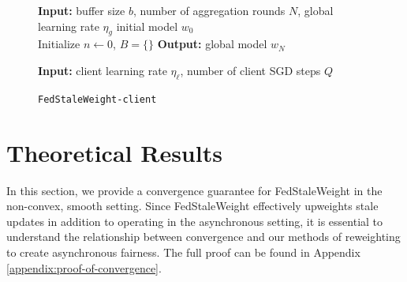 \documentclass{article}
\begin{document}
\begin{figure}[htbp]
\centering
\begin{minipage}{0.51\linewidth}
    \begin{algorithm}[H]
    \caption{\texttt{FedStaleWeight-server}}
    \label{algo:server}
    \SetAlgoLined
    \DontPrintSemicolon
    \textbf{Input: } buffer size $b$, number of aggregation rounds $N$, global learning rate $\eta_g$ initial model $w_0$\\
    Initialize $n \leftarrow 0$, $B = \{\}$ \;
    \textbf{Output: } global model $w_N$\\
    \end{algorithm}
\end{minipage}
\hfill
\begin{minipage}{0.47\linewidth}
    \begin{algorithm}[H]
    \caption{\texttt{FedStaleWeight-client}}
    \label{algo:client}
    \SetAlgoLined
    \DontPrintSemicolon
    \textbf{Input: } client learning rate $\eta_\ell$, number of client SGD steps $Q$\\
    \end{algorithm}
\end{minipage}
\end{figure}

\section{Theoretical Results}

In this section, we provide a convergence guarantee for FedStaleWeight in the non-convex, smooth setting. Since FedStaleWeight effectively upweights stale updates in addition to operating in the asynchronous setting, it is essential to understand the relationship between convergence and our methods of reweighting to create asynchronous fairness. The full proof can be found in Appendix \ref{appendix:proof-of-convergence}.
\end{document}
